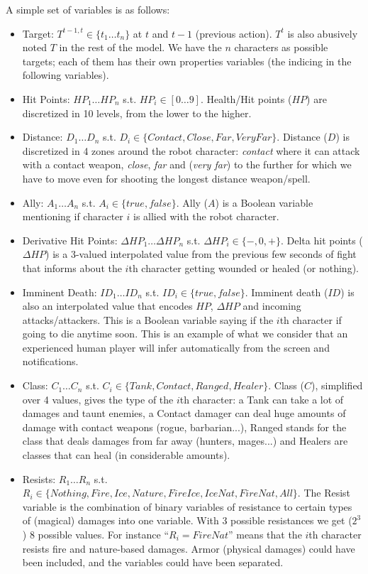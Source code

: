 A simple set of variables is as follows: 
\begin{itemize}
    \item Target: $T^{t-1,t} \in \{t_1\dots t_n\}$ at $t$ and $t-1$ (previous action). $T^t$ is also abusively noted $T$ in the rest of the model. We have the $n$ characters as possible targets; each of them has their own properties variables (the indicing in the following variables). 
    \item Hit Points: $HP_1 \dots HP_n$ s.t. $HP_i \in [0\dots 9]$. Health/Hit points ($HP$) are discretized in 10 levels, from the lower to the higher. 
    \item Distance: $D_1 \dots D_n$ s.t. $D_i \in \{Contact, Close, Far, VeryFar\}$. Distance ($D$) is discretized in 4 zones around the robot character: \textit{contact} where it can attack with a contact weapon, \textit{close}, \textit{far} and (\textit{very far}) to the further for which we have to move even for shooting the longest distance weapon/spell. 
    \item Ally: $A_1 \dots A_n$ s.t. $A_i \in \{true, false\}$. Ally ($A$) is a Boolean variable mentioning if character $i$ is allied with the robot character. 
    \item Derivative Hit Points: $\Delta HP_1 \dots \Delta HP_n$ s.t. $\Delta HP_i \in \{-, 0, +\}$. Delta hit points ($\Delta HP$) is a 3-valued interpolated value from the previous few seconds of fight that informs about the $i$th character getting wounded or healed (or nothing). 
    \item Imminent Death: $ID_1 \dots ID_n$ s.t. $ID_i \in \{true, false\}$. Imminent death ($ID$) is also an interpolated value that encodes $HP$, $\Delta HP$ and incoming attacks/attackers. This is a Boolean variable saying if the $i$th character if going to die anytime soon. This is an example of what we consider that an experienced human player will infer automatically from the screen and notifications. 
    \item Class: $C_1 \dots C_n$ s.t. $C_i \in \{Tank, Contact, Ranged, Healer\}$. Class ($C$), simplified over 4 values, gives the type of the $i$th character: a Tank can take a lot of damages and taunt enemies, a Contact damager can deal huge amounts of damage with contact weapons (rogue, barbarian...), Ranged stands for the class that deals damages from far away (hunters, mages...) and Healers are classes that can heal (in considerable amounts). 
    \item Resists: $R_1 \dots R_n$ s.t. $R_i \in \{Nothing, Fire, Ice, Nature, FireIce, IceNat, FireNat, All\}$. The Resist variable is the combination of binary variables of resistance to certain types of (magical) damages into one variable. With 3 possible resistances we get ($2^3$) 8 possible values. For instance ``$R_i=FireNat$'' means that the $i$th character resists fire and nature-based damages. Armor (physical damages) could have been included, and the variables could have been separated. 

\end{itemize}
